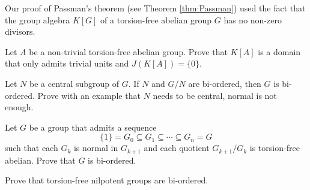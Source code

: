 Our proof of Passman's theorem (see Theorem \ref{thm:Passman}) 
used the fact that the group algebra $K[G]$ of
a torsion-free abelian group $G$ has no non-zero divisors. 

\begin{exercise}
\label{xca:domain_G_abelian}
	Let $A$ be a non-trivial torsion-free abelian group. Prove that $K[A]$ 
	is a domain that only admits trivial units and $J(K[A])=\{0\}$. 
\end{exercise}



\begin{exercise}
    Let $N$ be a central subgroup of $G$. If $N$ and $G/N$ are bi-ordered, 
    then $G$ is bi-ordered. Prove with an example that $N$ needs to be central, normal 
    is not enough. 
\end{exercise}

\begin{exercise}
    Let $G$ be a group that admits 
    a sequence 
    \[
    \{1\}=G_0\subseteq G_1\subseteq\cdots\subseteq G_n=G
    \]
    such that
    each $G_k$ is normal in $G_{k+1}$ and each quotient $G_{k+1}/G_k$ is 
    torsion-free abelian. Prove that $G$ is bi-ordered.  
\end{exercise}

\begin{exercise}
    Prove that torsion-free nilpotent groups are bi-ordered. 
\end{exercise}

